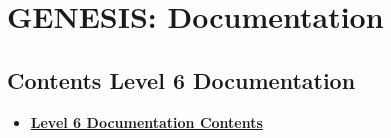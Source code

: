 \documentclass[12pt]{article}
\begin{document}
\section*{GENESIS: Documentation}

\subsection*{Contents Level 6 Documentation}

\begin{itemize}

\item \href{../contents-level6/contents-level6.pdf}{\bf \underline{Level 6 Documentation Contents}}


\end{itemize}

\end{document}
